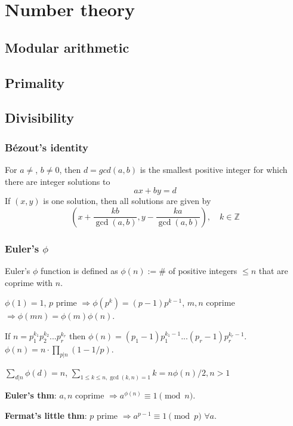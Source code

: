 \chapter{Number theory}

\section{Modular arithmetic}

\section{Primality}

\section{Divisibility}
    
	\subsection{Bézout's identity}
	For $a \neq $, $b \neq 0$, then $d=gcd(a,b)$ is the smallest positive integer for which there are integer solutions to
	$$ax+by=d$$
	If $(x,y)$ is one solution, then all solutions are given by
	$$\left(x+\frac{kb}{\gcd(a,b)}, y-\frac{ka}{\gcd(a,b)}\right), \quad k\in\mathbb{Z}$$

	\subsection{Euler's $\phi$} 
    
    Euler's $\phi$ function is defined as $\phi(n):=\#$ of positive integers $\leq n$ that are coprime with $n$.

    $\phi(1)=1$, $p$ prime $\Rightarrow \phi(p^k)=(p-1)p^{k-1}$, $m,n$ coprime $\Rightarrow \phi(mn)=\phi(m)\phi(n)$.

    If $n=p_1^{k_1}p_2^{k_2} ... p_r^{k_r}$ then $\phi(n) = (p_1-1)p_1^{k_1-1}...(p_r-1)p_r^{k_r-1}$.
    $\phi(n)=n \cdot \prod_{p|n}(1-1/p)$.
    
    $\sum_{d|n} \phi(d) = n$, $\sum_{1\leq k \leq n, \gcd(k,n)=1} k = n \phi(n)/2, n>1$

    \textbf{Euler's thm}: $a,n$ coprime $\Rightarrow a^{\phi(n)} \equiv 1 \pmod{n}$.
    
    \textbf{Fermat's little thm}: $p$ prime $\Rightarrow a^{p-1} \equiv 1 \pmod{p}$ $\forall a$.

